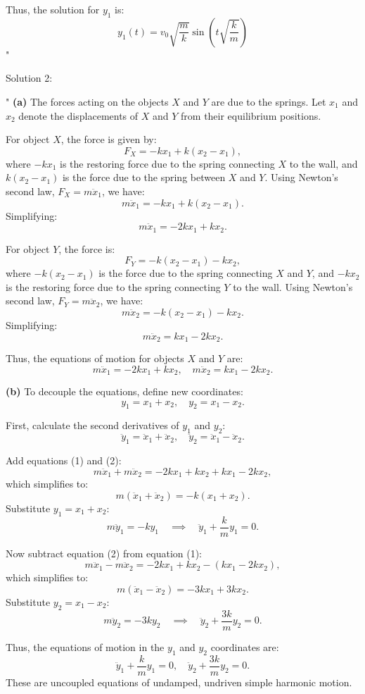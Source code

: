 Thus, the solution for $y_1$ is:
\[
y_1(t) = v_0 \sqrt{\frac{m}{k}} \sin\left(t \sqrt{\frac{k}{m}}\right)
\]"

Solution 2: 

"
\textbf{(a)} The forces acting on the objects $X$ and $Y$ are due to the springs. Let $x_1$ and $x_2$ denote the displacements of $X$ and $Y$ from their equilibrium positions.

For object $X$, the force is given by:
\[
F_X = -k x_1 + k (x_2 - x_1),
\]
where $-k x_1$ is the restoring force due to the spring connecting $X$ to the wall, and $k (x_2 - x_1)$ is the force due to the spring between $X$ and $Y$. Using Newton's second law, $F_X = m \ddot{x}_1$, we have:
\[
m \ddot{x}_1 = -k x_1 + k (x_2 - x_1).
\]
Simplifying:
\[
m \ddot{x}_1 = -2k x_1 + k x_2. \tag{1}
\]

For object $Y$, the force is:
\[
F_Y = -k (x_2 - x_1) - k x_2,
\]
where $-k (x_2 - x_1)$ is the force due to the spring connecting $X$ and $Y$, and $-k x_2$ is the restoring force due to the spring connecting $Y$ to the wall. Using Newton's second law, $F_Y = m \ddot{x}_2$, we have:
\[
m \ddot{x}_2 = -k (x_2 - x_1) - k x_2.
\]
Simplifying:
\[
m \ddot{x}_2 = k x_1 - 2k x_2. \tag{2}
\]

Thus, the equations of motion for objects $X$ and $Y$ are:
\[
\boxed{m \ddot{x}_1 = -2k x_1 + k x_2, \quad m \ddot{x}_2 = k x_1 - 2k x_2.}
\]

\textbf{(b)} To decouple the equations, define new coordinates:
\[
y_1 = x_1 + x_2, \quad y_2 = x_1 - x_2.
\]

First, calculate the second derivatives of $y_1$ and $y_2$:
\[
\ddot{y}_1 = \ddot{x}_1 + \ddot{x}_2, \quad \ddot{y}_2 = \ddot{x}_1 - \ddot{x}_2.
\]

Add equations (1) and (2):
\[
m \ddot{x}_1 + m \ddot{x}_2 = -2k x_1 + k x_2 + k x_1 - 2k x_2,
\]
which simplifies to:
\[
m (\ddot{x}_1 + \ddot{x}_2) = -k (x_1 + x_2).
\]
Substitute $y_1 = x_1 + x_2$:
\[
m \ddot{y}_1 = -k y_1 \quad \implies \quad \ddot{y}_1 + \frac{k}{m} y_1 = 0. \tag{3}
\]

Now subtract equation (2) from equation (1):
\[
m \ddot{x}_1 - m \ddot{x}_2 = -2k x_1 + k x_2 - (k x_1 - 2k x_2),
\]
which simplifies to:
\[
m (\ddot{x}_1 - \ddot{x}_2) = -3k x_1 + 3k x_2.
\]
Substitute $y_2 = x_1 - x_2$:
\[
m \ddot{y}_2 = -3k y_2 \quad \implies \quad \ddot{y}_2 + \frac{3k}{m} y_2 = 0. \tag{4}
\]

Thus, the equations of motion in the $y_1$ and $y_2$ coordinates are:
\[
\boxed{\ddot{y}_1 + \frac{k}{m} y_1 = 0, \quad \ddot{y}_2 + \frac{3k}{m} y_2 = 0.}
\]
These are uncoupled equations of undamped, undriven simple harmonic motion.

